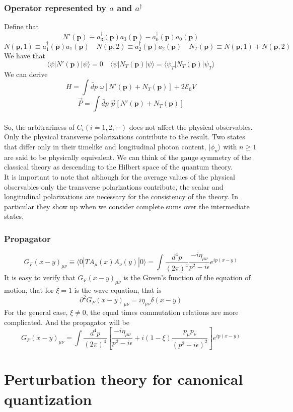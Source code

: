 \documentclass[cyan]{elegantnote}
\begin{document}
\subsubsection{Operator represented by $a$ and $a^{\dagger}$}
\noindent
Define that
\[N'(\bm{p}) \equiv a^{\dagger}_{3}(\bm{p})a_{3}(\bm{p})-a^{\dagger}_{0}(\bm{p})a_{0}(\bm{p})\]
\[N(\bm{p},1) \equiv a^{\dagger}_{1}(\bm{p}) a_{1}(\bm{p}) \quad N(\bm{p},2) \equiv a^{\dagger}_{2}(\bm{p}) a_{2}(\bm{p}) \quad N_T(\bm{p}) \equiv N(\bm{p},1) + N(\bm{p},2)\]
We have that
\[\langle \psi | N'(\bm{p}) | \psi\rangle = 0 \quad \langle \psi | N_T(\bm{p}) | \psi\rangle = \langle \psi_T | N_T(\bm{p}) | \psi_T\rangle\]
We can derive
\[ H = \int \widetilde{dp} \; \omega [N'(\bm{p}) + N_T(\bm{p})] + 2\mathcal{E}_0V\]
\[ \vec{P} = \int \widetilde{dp} \; \vec{p} [N'(\bm{p}) + N_T(\bm{p})]\]
\\
So, the arbitrariness of $C_i(i=1,2,\cdots)$ does not affect the physical observables. Only the physical transverse polarizations
contribute to the result. Two states that differ only in their timelike and longitudinal photon content, $|\phi_n\rangle$ with $n \geq 1$ are said to be physically equivalent. We can think of the gauge symmetry of the classical theory as descending to the Hilbert space of the quantum theory.
\\
It is important to note that although for the average values of the physical observables only the transverse polarizations contribute, the scalar and longitudinal polarizations are necessary for the consistency of the theory. In particular they show up when we consider complete sums over the intermediate states.

\subsubsection{Propagator}
\[G_F(x-y)_{\mu\nu} \equiv \langle 0 |T A_{\mu}(x) A_{\nu}(y) | 0 \rangle = \int \frac{d^4p}{(2\pi)^4} \frac{-i\eta_{\mu\nu}}{p^2-i\epsilon}  e^{ip(x-y)}\]
It is easy to verify that $G_F(x-y)_{\mu\nu}$ is the Green's function of the equation of motion, that for $\xi=1$ is the wave equation, that is
\[\partial^2 G_F(x-y)_{\mu\nu} = i\eta_{\mu\nu}\delta(x-y)\]
For the general case, $\xi \neq 0$, the equal times commutation relations are more complicated. And the propagator will be
\[G_F(x-y)_{\mu\nu}  = \int \frac{d^4p}{(2\pi)^4} \left[\frac{-i\eta_{\mu\nu}}{p^2-i\epsilon} + i(1-\xi)\frac{p_{\mu}p_{\nu}}{(p^2-i\epsilon)^2}\right] e^{ip(x-y)}\]

\section{Perturbation theory for canonical quantization}
\end{document}
